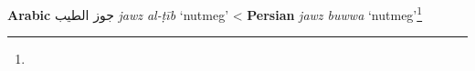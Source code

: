 \begin{etymology}\label{ety:jawz al-tib}
\textbf{Arabic} {جوز الطيب} \textit{jawz al-ṭīb} `nutmeg'
< \textbf{Persian} \textit{jawz buwwa} `nutmeg'\footnote{}
\end{etymology}
